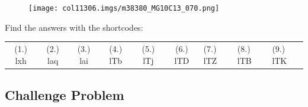 \begin{enumerate}[noitemsep,
label=\textbf{\arabic*}. ]
	\begin{figure}[H] %
    \begin{center}
   
\label{m38380*id401236!!!underscore!!!media}\label{
m38380*id401236!!!underscore!!!printimage}\texttt{[image: 
col11306.imgs/m38380\_MG10C13\_070.png]} %
        
      \vspace{2pt}
    \vspace{.1in}
    
    \end{center}

 \end{figure}   

    \addtocounter{footnote}{-0}
    
        
\end{enumerate}
        
      \label{m38380*uid132}
\par {} Find the
answers with the shortcodes:
 \par \begin{tabular}[h]{cccccc}
 (1.) lxh  &  (2.) laq  &  (3.) lai  &  (4.) lTb  &  (5.) lTj  &  (6.) lTD  & 
(7.) lTZ  &  (8.) lTB  &  (9.) lTK  & \end{tabular}

\pagebreak

        \subsection{ Challenge Problem}
        \nopagebreak
        
